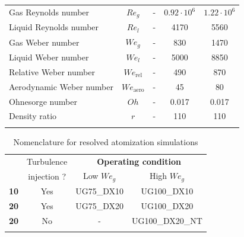 \begin{table}[!h]
\begin{tabular}{lcccc}
Gas Reynolds number & $Re_g$ & - & $0.92 \cdot 10^6$ & $1.22 \cdot 10^6$ \\
Liquid Reynolds number & $Re_l$ & - & 4170 & 5560 \\
Gas Weber number & $We_g$ & - & 830 & 1470 \\
Liquid Weber number & $We_l$ & - & 5000 & 8850 \\
Relative Weber number & $We_\mathrm{rel}$ & - & 490 & 870 \\
Aerodynamic Weber number & $We_\mathrm{aero}$ & - & 45 & 80 \\
Ohnesorge number & $Oh $ & - & 0.017 & 0.017 \\
Density ratio & $r$ & - & 110 & 110 \\
\thickhline
\end{tabular}
\label{tab:jicf_operating_conditions}
\end{table}




\begin{table}[!h]
\centering
\caption{Nomenclature for resolved atomization simulations}
\begin{tabular}{cccc}
\thickhline
\multirow{2}{*}{ $\Delta x_\mathrm{min}$ [$\mu$m] } & Turbulence & \multicolumn{2}{c}{\textbf{Operating condition}} \\ 
\cline{3-4}
 & injection ? & Low $We_g$ &  High $We_g$ \\ 
\thickhline
\textbf{10} & Yes & UG75\_DX10 & UG100\_DX10 \\
\textbf{20} & Yes & UG75\_DX20 & UG100\_DX20 \\
\textbf{20} & No & - & UG100\_DX20\_NT \\
\thickhline
\end{tabular}
\label{tab:jicf_resolved_simulations_performed}
\end{table}


